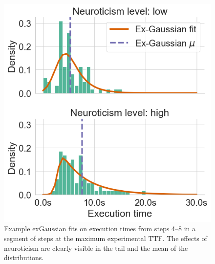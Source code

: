 \begin{figure}
    \centering
    \includegraphics[width=.9\columnwidth]{figs/new_model/dist_fits_neuro}
    \caption{%
        Example \gls{exGaussian} fits on execution times from steps \numrange{4}{8} in a segment of steps at the maximum experimental \gls{TTF}.
        The effects of neuroticism are clearly visible in the tail and the mean of the distributions.
    }\label{fig:fitsneuro}
\end{figure}
